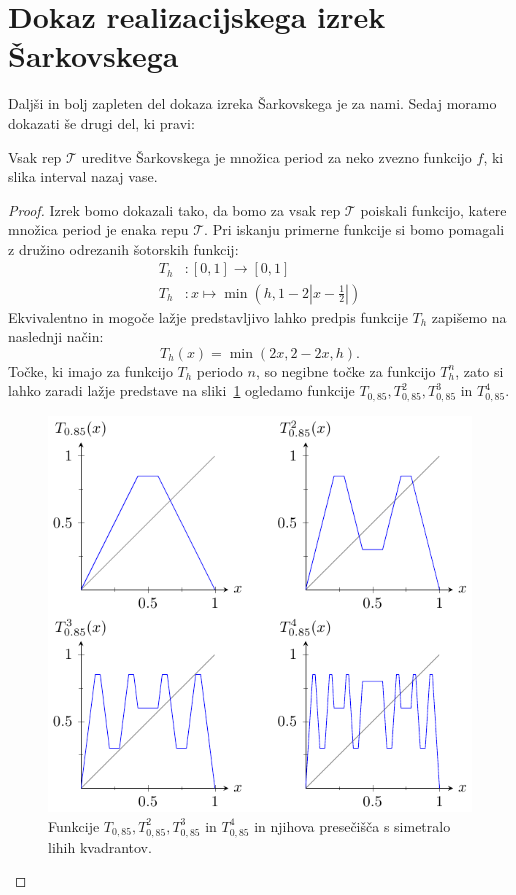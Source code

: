 \documentclass[mat2]{fmfdelo}
\begin{document}
\section{Dokaz realizacijskega izrek Šarkovskega}\label{sec:realizacija}
Daljši in bolj zapleten del dokaza izreka Šarkovskega je za nami. Sedaj moramo dokazati še drugi del, ki pravi:
\begin{izrek}
Vsak rep $\mathcal{T}$ ureditve Šarkovskega je množica period za neko zvezno funkcijo $f$, ki slika interval nazaj vase.
\end{izrek}
\begin{proof}
Izrek bomo dokazali tako, da bomo za vsak rep $\mathcal{T}$ poiskali funkcijo, katere množica period je enaka repu $\mathcal{T}$. Pri iskanju primerne funkcije si bomo pomagali z družino odrezanih šotorskih funkcij:
\begin{equation*} %
\begin{split}
T_h &:  [0, 1] \to [0, 1] \\ 
T_h &: x \mapsto \min \left(h, 1- 2 \left|x-\frac{1}{2} \right|\right)
\end{split}
\end{equation*}
Ekvivalentno in mogoče lažje predstavljivo lahko predpis funkcije $T_h$ zapišemo na naslednji način:
\begin{equation*} %
T_h(x) = \min(2x, 2-2x, h).
\end{equation*}
Točke, ki imajo za funkcijo $T_h$ periodo $n$, so negibne točke za funkcijo $T_h^n$, zato si lahko zaradi lažje predstave na sliki~\ref{fig:Th} ogledamo funkcije $T_{0,85}, T_{0,85}^2, T_{0,85}^3$ in $T_{0,85}^4$. 
\begin{figure}[h]
  \centering
  \includegraphics{images/odrezana_funkcija.pdf}
  \caption[Primer vektorske slike.]{Funkcije  $T_{0,85}, T_{0,85}^2, T_{0,85}^3$ in $T_{0,85}^4$ in njihova presečišča s simetralo lihih kvadrantov.}
  \label{fig:Th}
\end{figure}


\end{proof}
\end{document}
